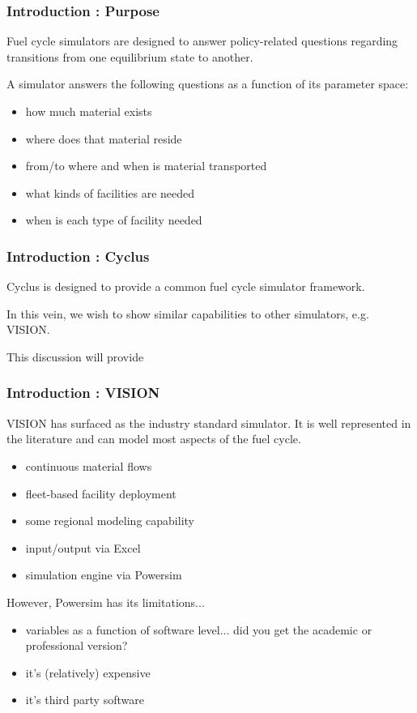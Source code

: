 
\begin{frame}[ctb!]
  \frametitle{Introduction : Purpose}
  Fuel cycle simulators are designed to answer policy-related questions
  regarding transitions from one equilibrium state to another.

  \vspace{0.2cm}

  \pause
  A simulator answers the following questions as a function of its 
  parameter space:
  \begin{itemize}
    \item how much material exists
    \item where does that material reside
    \item from/to where and when is material transported
    \item what kinds of facilities are needed
    \item when is each type of facility needed
  \end{itemize}
\end{frame}

\begin{frame}[ctb!]
  \frametitle{Introduction : Cyclus}
  Cyclus is designed to provide a common fuel cycle simulator 
  framework.

  In this vein, we wish to show similar capabilities to other 
  simulators, e.g. VISION.

  This discussion will provide 
\end{frame}

\begin{frame}[ctb!]
  \frametitle{Introduction : VISION}
  VISION has surfaced as the industry standard simulator. It is well
  represented in the literature and can model most aspects of the
  fuel cycle. \cite{yacout_vision_2006}
  \begin{itemize}
    \item continuous material flows
    \item fleet-based facility deployment
    \item some regional modeling capability
    \item input/output via Excel
    \item simulation engine via Powersim
  \end{itemize}
  However, Powersim has its limitations...
  \begin{itemize}
    \item variables as a function of software level... did you get the academic or professional version?
    \item it's (relatively) expensive
    \item it's third party software
  \end{itemize}
\end{frame}
